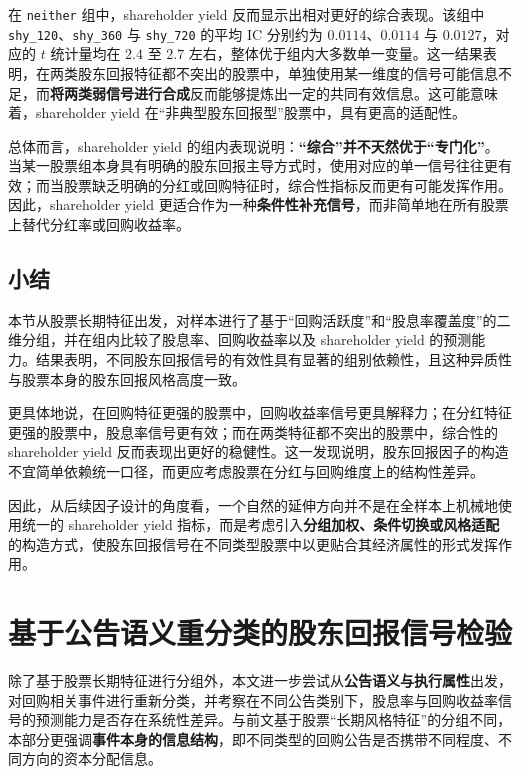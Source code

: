 \documentclass[a4paper,10pt]{article}
\begin{document}
在 \texttt{neither} 组中，shareholder yield 反而显示出相对更好的综合表现。该组中 \texttt{shy\_120}、\texttt{shy\_360} 与 \texttt{shy\_720} 的平均 IC 分别约为 $0.0114$、$0.0114$ 与 $0.0127$，对应的 $t$ 统计量均在 $2.4$ 至 $2.7$ 左右，整体优于组内大多数单一变量。这一结果表明，在两类股东回报特征都不突出的股票中，单独使用某一维度的信号可能信息不足，而\textbf{将两类弱信号进行合成}反而能够提炼出一定的共同有效信息。这可能意味着，shareholder yield 在“非典型股东回报型”股票中，具有更高的适配性。

总体而言，shareholder yield 的组内表现说明：\textbf{“综合”并不天然优于“专门化”}。当某一股票组本身具有明确的股东回报主导方式时，使用对应的单一信号往往更有效；而当股票缺乏明确的分红或回购特征时，综合性指标反而更有可能发挥作用。因此，shareholder yield 更适合作为一种\textbf{条件性补充信号}，而非简单地在所有股票上替代分红率或回购收益率。

\subsection{小结}

本节从股票长期特征出发，对样本进行了基于“回购活跃度”和“股息率覆盖度”的二维分组，并在组内比较了股息率、回购收益率以及 shareholder yield 的预测能力。结果表明，不同股东回报信号的有效性具有显著的组别依赖性，且这种异质性与股票本身的股东回报风格高度一致。

更具体地说，在回购特征更强的股票中，回购收益率信号更具解释力；在分红特征更强的股票中，股息率信号更有效；而在两类特征都不突出的股票中，综合性的 shareholder yield 反而表现出更好的稳健性。这一发现说明，股东回报因子的构造不宜简单依赖统一口径，而更应考虑股票在分红与回购维度上的结构性差异。

因此，从后续因子设计的角度看，一个自然的延伸方向并不是在全样本上机械地使用统一的 shareholder yield 指标，而是考虑引入\textbf{分组加权、条件切换或风格适配}的构造方式，使股东回报信号在不同类型股票中以更贴合其经济属性的形式发挥作用。










\section{基于公告语义重分类的股东回报信号检验}

除了基于股票长期特征进行分组外，本文进一步尝试从\textbf{公告语义与执行属性}出发，对回购相关事件进行重新分类，并考察在不同公告类别下，股息率与回购收益率信号的预测能力是否存在系统性差异。与前文基于股票“长期风格特征”的分组不同，本部分更强调\textbf{事件本身的信息结构}，即不同类型的回购公告是否携带不同程度、不同方向的资本分配信息。
\end{document}
